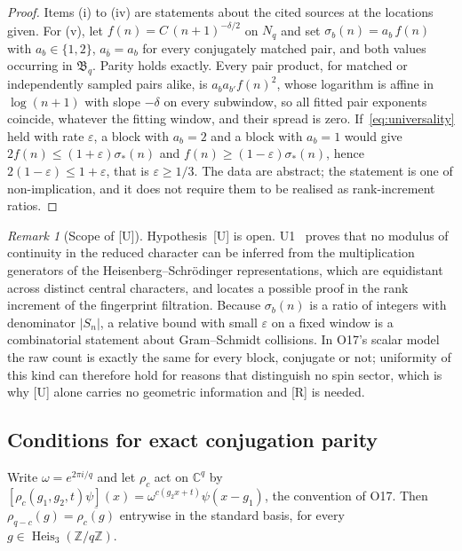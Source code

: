 \documentclass[12pt,a4paper]{article}
\theoremstyle{definition}
\theoremstyle{remark}
\newtheorem{remark}[theorem]{Remark}
\DeclareMathOperator{\Heis}{Heis}
\newcommand{\Bq}{\mathfrak{B}_q}
\newcommand{\Nq}{N_q}
\begin{document}
      \begin{proof}
        Items (i) to (iv) are statements about the cited sources at the locations given.
        For (v), let $f(n) = C\,(n+1)^{-\delta/2}$ on $\Nq$ and set $\sigma_b(n) = a_b\,f(n)$ with
        $a_b \in \{1, 2\}$, $a_{\bar b} = a_b$ for every conjugately matched pair, and both values occurring in $\Bq$.
        Parity holds exactly.
        Every pair product, for matched or independently sampled pairs alike, is $a_b a_{b'} f(n)^2$, whose
        logarithm is affine in $\log(n+1)$ with slope $-\delta$ on every subwindow, so all fitted pair exponents
        coincide, whatever the fitting window, and their spread is zero.
        If~\eqref{eq:universality} held with rate $\varepsilon$, a block with $a_b = 2$ and a block with $a_b = 1$
        would give $2f(n) \leq (1+\varepsilon)\sigma_*(n)$ and $f(n) \geq (1-\varepsilon)\sigma_*(n)$, hence
        $2(1-\varepsilon) \leq 1 + \varepsilon$, that is $\varepsilon \geq 1/3$.
        The data are abstract; the statement is one of non-implication, and it does not require them to be realised
        as rank-increment ratios.
      \end{proof}

      \begin{remark}[Scope of \textup{[U]}]\label{rem:U-scope}
        Hypothesis~[U] is open.
        U1~\cite{Beau2026u1} proves that no modulus of continuity in the reduced character can be inferred from the
        multiplication generators of the Heisenberg--Schr\"odinger representations, which are equidistant across
        distinct central characters,
        and locates a possible proof in the rank increment of the fingerprint filtration.
        Because $\sigma_b(n)$ is a ratio of integers with denominator $|S_n|$, a relative bound with small
        $\varepsilon$ on a fixed window is a combinatorial statement about Gram--Schmidt collisions.
        In O17's scalar model the raw count is exactly the same for every block, conjugate or not; uniformity of
        this kind can therefore hold for reasons that distinguish no spin sector, which is why [U] alone carries no
        geometric information and [R] is needed.
      \end{remark}

    \subsection{Conditions for exact conjugation parity}

      Write $\omega = e^{2\pi i/q}$ and let $\rho_c$ act on $\mathbb{C}^q$ by
      $[\rho_c(g_1, g_2, t)\psi](x) = \omega^{c(g_2 x+t)}\psi(x - g_1)$, the convention of O17.
      Then $\rho_{q-c}(g) = \overline{\rho_c(g)}$ entrywise in the standard basis, for every
      $g \in \Heis_3(\mathbb{Z}/q\mathbb{Z})$.
\end{document}

